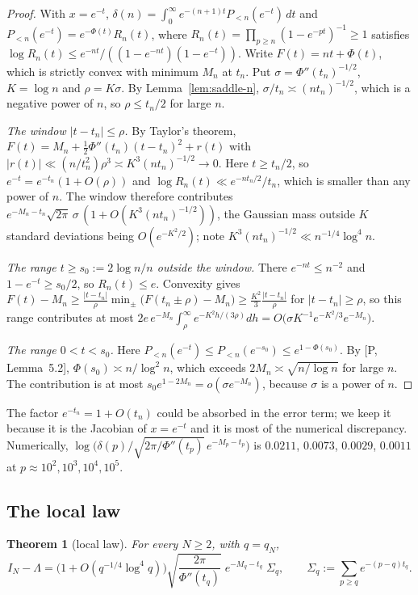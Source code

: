 \documentclass[11pt]{article}
\newtheorem{theorem}{Theorem}[section]
\theoremstyle{remark}
\begin{document}
\begin{proof}
With $x=e^{-t}$, $\delta(n)=\int_0^\infty e^{-(n+1)t}P_{<n}(e^{-t})\,dt$ and
$P_{<n}(e^{-t})=e^{-\Phi(t)}R_n(t)$, where $R_n(t)=\prod_{p\ge n}(1-e^{-pt})^{-1}\ge1$ satisfies
$\log R_n(t)\le e^{-nt}/((1-e^{-nt})(1-e^{-t}))$. Write $F(t)=nt+\Phi(t)$, which is strictly
convex with minimum $M_n$ at $t_n$. Put $\sigma=\Phi''(t_n)^{-1/2}$, $K=\log n$ and
$\rho=K\sigma$. By Lemma~\ref{lem:saddle-n}, $\sigma/t_n\asymp(nt_n)^{-1/2}$, which is a negative
power of $n$, so $\rho\le t_n/2$ for large $n$.

\emph{The window $|t-t_n|\le\rho$.} By Taylor's theorem,
$F(t)=M_n+\frac12\Phi''(t_n)(t-t_n)^2+r(t)$ with
$|r(t)|\ll(n/t_n^2)\rho^3\asymp K^3(nt_n)^{-1/2}\to0$. Here $t\ge t_n/2$, so $e^{-t}=e^{-t_n}(1+O(\rho))$ and
$\log R_n(t)\ll e^{-nt_n/2}/t_n$, which is smaller than any power of $n$. The window
therefore contributes $e^{-M_n-t_n}\sqrt{2\pi}\,\sigma\,(1+O(K^3(nt_n)^{-1/2}))$, the Gaussian
mass outside $K$ standard deviations being $O(e^{-K^2/2})$; note $K^3(nt_n)^{-1/2}\ll
n^{-1/4}\log^4n$.

\emph{The range $t\ge s_0:=2\log n/n$ outside the window.} There $e^{-nt}\le n^{-2}$ and
$1-e^{-t}\ge s_0/2$, so $R_n(t)\le e$. Convexity gives
$F(t)-M_n\ge\frac{|t-t_n|}{\rho}\min_\pm\bigl(F(t_n\pm\rho)-M_n\bigr)\ge\frac{K^2}{3}\frac{|t-t_n|}{\rho}$
for $|t-t_n|\ge\rho$, so this range contributes at most
$2e\,e^{-M_n}\int_\rho^\infty e^{-K^2h/(3\rho)}dh=O\bigl(\sigma K^{-1}e^{-K^2/3}e^{-M_n}\bigr)$.

\emph{The range $0<t<s_0$.} Here $P_{<n}(e^{-t})\le P_{<n}(e^{-s_0})\le e^{1-\Phi(s_0)}$. By
[P, Lemma~5.2], $\Phi(s_0)\asymp n/\log^2n$, which exceeds $2M_n\asymp\sqrt{n/\log n}$ for large $n$.
The contribution is at most $s_0e^{1-2M_n}=o(\sigma e^{-M_n})$, because $\sigma$ is a power of $n$.
\end{proof}

The factor $e^{-t_n}=1+O(t_n)$ could be absorbed in the error term; we keep it because it is
the Jacobian of $x=e^{-t}$ and it is most of the numerical discrepancy. Numerically,
$\log\bigl(\delta(p)\big/\sqrt{2\pi/\Phi''(t_p)}\,e^{-M_p-t_p}\bigr)$ is
$0.0211$, $0.0073$, $0.0029$, $0.0011$ at $p\approx10^2,10^3,10^4,10^5$.

\subsection{The local law}

\begin{theorem}[local law]\label{thm:local}
For every $N\ge2$, with $q=q_N$,
\[
I_N-\Lambda=\bigl(1+O(q^{-1/4}\log^4q)\bigr)\sqrt{\frac{2\pi}{\Phi''(t_q)}}\;e^{-M_q-t_q}\;\Sigma_q,
\qquad\Sigma_q:=\sum_{p\ge q}e^{-(p-q)t_q} .
\]
\end{theorem}
\end{document}
